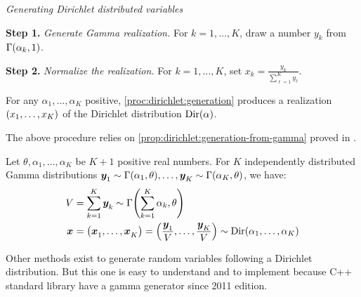 \begin{proc}\label{proc:dirichlet:generation}
\emph{Generating Dirichlet distributed variables}

\textbf{Step 1.} \emph{Generate Gamma realization.} For $k=1,\ldots,K$, draw a number $y_k$ from $\Gamma\bracket{\alpha_k,1}$.

\textbf{Step 2.} \emph{Normalize the realization.} For $k=1,\ldots,K$, set $x_k=\frac{y_k}{\sum_{\ell=1}^K y_{\ell}}$.
\end{proc}


\begin{prop}
For any $\alpha_1,\ldots,\alpha_K$ positive, \cref{proc:dirichlet:generation} produces a realization $\bracket{x_1,\ldots,x_K}$ of the Dirichlet distribution $\Dir\bracket{\alpha}$.
\end{prop}


The above procedure relies on \cref{prop:dirichlet:generation-from-gamma} proved in \cite{Devroye1986}.

\begin{prop}\label{prop:dirichlet:generation-from-gamma}
Let $\theta,\alpha_1,\ldots,\alpha_K$ be $K+1$ positive real numbers.
For $K$ independently distributed Gamma distributions
$\va y_1\sim\Gamma\bracket{\alpha_1,\theta},\ldots,\va y_K\sim\Gamma\bracket{\alpha_K,\theta}$,
we have:
\begin{subequations}
  \begin{align}
    V &= \sum_{k=1}^K \va y_k \sim \Gamma\bracket{\sum_{k=1}^K \alpha_k,\theta}
    \\
    \va x &= \bracket{\va x_1,\ldots,\va x_K} = \bracket{\frac{\va y_1}{V},\ldots,\frac{\va y_K}{V}} \sim \Dir\bracket{\alpha_1,\ldots,\alpha_K}
  \end{align}
\end{subequations}
\end{prop}

Other methods exist to generate random variables following a Dirichlet distribution. But this one is easy to understand and to implement because C++ standard library have a gamma generator since 2011 edition.


